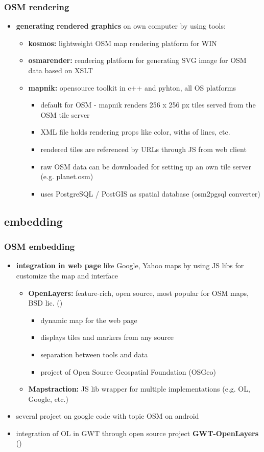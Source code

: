 \documentclass[blue]{beamer}
\begin{document}
\frame
{
\frametitle{\textbf{OSM rendering}}
\begin{itemize}
\item \textbf{generating rendered graphics} on own computer by using tools:
	\begin{itemize}
			\item \textbf{kosmos:} lightweight OSM map rendering platform for WIN
			\item \textbf{osmarender:} rendering platform for generating SVG image for OSM data based on XSLT
			\item \textbf{mapnik:} opensource toolkit in c++ and pyhton, all OS platforms
			\begin{itemize}
				\item default for OSM - mapnik renders 256 x 256 px tiles served from the OSM tile server
				\item XML file holds rendering props like color, withs of lines, etc.
				\item rendered tiles are referenced by URLs through JS from web client
				\item raw OSM data can be downloaded for setting up an own tile server (e.g. planet.osm)
				\item uses PostgreSQL / PostGIS as spatial database (osm2pgsql converter)
		\end{itemize}
	\end{itemize}
\end{itemize}
}

\subsection{embedding}
\frame
{
\frametitle{\textbf{OSM embedding}}
\begin{itemize}
	\item \textbf{integration in web page} like Google, Yahoo maps by using JS libs for customize the map and interface
	\begin{itemize}
		\item \textbf{OpenLayers:} feature-rich, open source, most popular for OSM maps, BSD lic. ()
		\begin{itemize}
			\item dynamic map for the web page
			\item displays tiles and markers from any source
			\item separation between tools and data
			\item project of Open Source Geospatial Foundation (OSGeo)
		\end{itemize}
		\item \textbf{Mapstraction:} JS lib wrapper for multiple implementations (e.g. OL, Google, etc.)
	\end{itemize}
	\item several project on google code with topic OSM on android
	\item integration of OL in GWT through open source project \textbf{GWT-OpenLayers} ()
\end{itemize}
}
\end{document}
